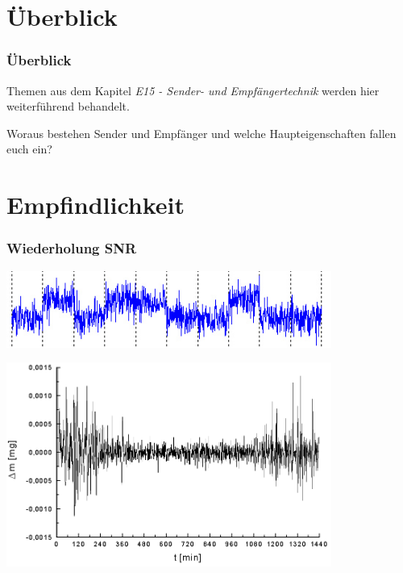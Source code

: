

\subtitle{Technik Klasse A 18: \\
          Gerätetechnik \\[2em]}
\date{Stand 09.07.2015}


\section{Überblick}

\begin{frame}
    \frametitle{Überblick}

    Themen aus dem Kapitel \emph{E15 - Sender- und Empfängertechnik} werden hier
    weiterführend behandelt.

    \bigskip


    Woraus bestehen Sender und Empfänger und welche Haupteigenschaften fallen
    euch ein?

\end{frame}

\section{Empfindlichkeit}

\begin{frame}
    \frametitle{Wiederholung SNR}

    \begin{center}
        \includegraphics[width=0.8\textwidth]{a18/Received_message.jpg}
        \tiny \hyperlink{refs}{\cite{wc}}
    \end{center}

    \begin{center}
    \includegraphics[width=0.8\textwidth]{a18/Analyse_thermo_gravimetrique_bruit.png}
        \tiny \hyperlink{refs}{\cite{wc}}
    \end{center}

\end{frame}


